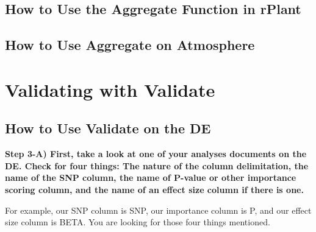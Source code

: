 \documentclass[twoside,a4paper]{refart}
\begin{document}
\begin{center}
\end{center}

\subsection{How to Use the Aggregate Function in rPlant}

\subsection{How to Use Aggregate on Atmosphere}

\section{Validating with Validate}

\subsection{How to Use Validate on the DE}

\textbf{Step 3-A) First, take a look at one of your analyses documents on the DE. Check for four things: The nature of the column delimitation, the name of the SNP column, the name of P-value or other importance scoring column, and the name of an effect size column if there is one.}

For example, our SNP column is SNP, our importance column is P, and our effect size column is BETA. You are looking for those four things mentioned. 
\end{document}

